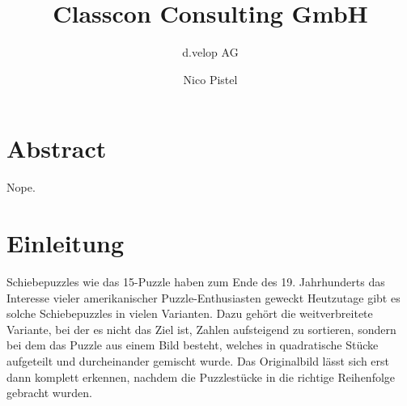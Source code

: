 \documentclass{whswinvcbook}
\title[Bericht]{Classcon Consulting GmbH}
\subtitle{d.velop AG}
\author[Nico Pistel]{Nico Pistel}
\begin{document}
\frontmatter

\maketitle

\cleardoublepage
\chapter*{Abstract}
Nope.

\tableofs
\lstlistoflistings

\mainmatter

\chapter{Einleitung}
Schiebepuzzles wie das 15-Puzzle haben zum Ende des 19. Jahrhunderts das Interesse vieler amerikanischer Puzzle-Enthusiasten geweckt\cite{perelman,sloson} Heutzutage gibt es solche Schiebepuzzles in vielen Varianten. Dazu gehört die weitverbreitete Variante, bei der es nicht das Ziel ist, Zahlen aufsteigend zu sortieren, sondern bei dem das Puzzle aus einem Bild besteht, welches in quadratische Stücke aufgeteilt und durcheinander gemischt wurde. Das Originalbild lässt sich erst dann komplett erkennen, nachdem die Puzzlestücke in die richtige Reihenfolge gebracht wurden.
\end{document}
